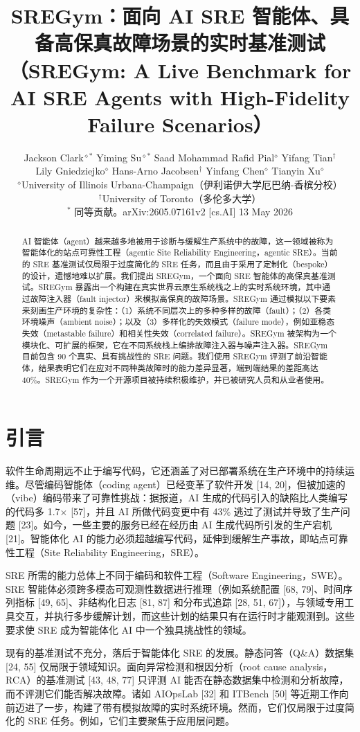 \documentclass[11pt,UTF8,fontset=fandol]{ctexart}
\title{\textbf{SREGym：面向 AI SRE 智能体、具备高保真故障场景的实时基准测试\\[2pt]\large（SREGym: A Live Benchmark for AI SRE Agents with High-Fidelity Failure Scenarios）}}
\author{Jackson Clark$^{\diamond *}$ \quad Yiming Su$^{\diamond *}$ \quad Saad Mohammad Rafid Pial$^{\diamond}$ \quad Yifang Tian$^{\dagger}$\\
Lily Gniedziejko$^{\diamond}$ \quad Hans-Arno Jacobsen$^{\dagger}$ \quad Yinfang Chen$^{\diamond}$ \quad Tianyin Xu$^{\diamond}$\\[4pt]
$^{\diamond}$University of Illinois Urbana-Champaign（伊利诺伊大学厄巴纳-香槟分校）\\
$^{\dagger}$University of Toronto（多伦多大学）\\[2pt]
\small $^{*}$ 同等贡献。\quad arXiv:2605.07161v2 [cs.AI] 13 May 2026}
\date{}
\begin{document}
\maketitle

\begin{abstract}
AI 智能体（agent）越来越多地被用于诊断与缓解生产系统中的故障，这一领域被称为智能体化的站点可靠性工程（agentic Site Reliability Engineering，agentic SRE）。当前的 SRE 基准测试仅局限于过度简化的 SRE 任务，而且由于采用了定制化（bespoke）的设计，遗憾地难以扩展。我们提出 SREGym，一个面向 SRE 智能体的高保真基准测试。SREGym 暴露出一个构建在真实世界云原生系统栈之上的实时系统环境，其中通过故障注入器（fault injector）来模拟高保真的故障场景。SREGym 通过模拟以下要素来刻画生产环境的复杂性：（1）系统不同层次上的多种多样的故障（fault）；（2）各类环境噪声（ambient noise）；以及（3）多样化的失效模式（failure mode），例如亚稳态失效（metastable failure）和相关性失效（correlated failure）。SREGym 被架构为一个模块化、可扩展的框架，它在不同系统栈上编排故障注入器与噪声注入器。SREGym 目前包含 90 个真实、具有挑战性的 SRE 问题。我们使用 SREGym 评测了前沿智能体，结果表明它们在应对不同种类故障时的能力差异显著，端到端结果的差距高达 40\%。SREGym 作为一个开源项目被持续积极维护，并已被研究人员和从业者使用。
\end{abstract}

\section{引言}

软件生命周期远不止于编写代码，它还涵盖了对已部署系统在生产环境中的持续运维。尽管编码智能体（coding agent）已经变革了软件开发 [14, 20]，但被加速的（vibe）编码带来了可靠性挑战：据报道，AI 生成的代码引入的缺陷比人类编写的代码多 1.7$\times$ [57]，并且 AI 所做代码变更中有 43\% 逃过了测试并导致了生产问题 [23]。如今，一些主要的服务已经在经历由 AI 生成代码所引发的生产宕机 [21]。智能体化 AI 的能力必须超越编写代码，延伸到缓解生产事故，即站点可靠性工程（Site Reliability Engineering，SRE）。

SRE 所需的能力总体上不同于编码和软件工程（Software Engineering，SWE）。SRE 智能体必须跨多模态可观测性数据进行推理（例如系统配置 [68, 79]、时间序列指标 [49, 65]、非结构化日志 [81, 87] 和分布式追踪 [28, 51, 67]），与领域专用工具交互，并执行多步缓解计划，而这些计划的结果只有在运行时才能观测到。这些要求使 SRE 成为智能体化 AI 中一个独具挑战性的领域。

现有的基准测试不充分，落后于智能体化 SRE 的发展。静态问答（Q\&A）数据集 [24, 55] 仅局限于领域知识。面向异常检测和根因分析（root cause analysis，RCA）的基准测试 [43, 48, 77] 只评测 AI 能否在静态数据集中检测和分析故障，而不评测它们能否解决故障。诸如 AIOpsLab [32] 和 ITBench [50] 等近期工作向前迈进了一步，构建了带有模拟故障的实时系统环境。然而，它们仅局限于过度简化的 SRE 任务。例如，它们主要聚焦于应用层问题。
\end{document}
